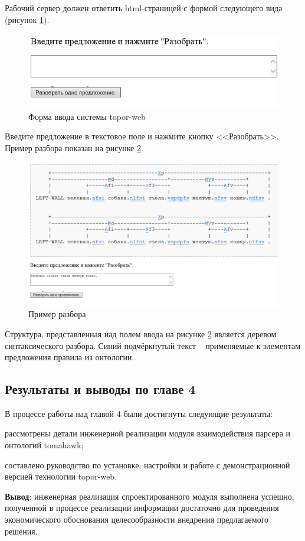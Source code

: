 Рабочий сервер должен ответить html-страницей с формой следующего
вида (рисунок \ref{fig:form}).

\begin{figure}[H]
	\centering
		\includegraphics[scale=1.0]{images/form.png}
	\caption{\small Форма ввода системы topor-web}
	\label{fig:form}
\end{figure} 

Введите предложение в текстовое поле и нажмите кнопку <<Разобрать>>.
Пример разбора показан на рисунке \ref{fig:parse}.

\begin{figure}[H]
	\centering
		\includegraphics[scale=0.5]{images/parse.png}
	\caption{\small Пример разбора}
	\label{fig:parse}
\end{figure} 

Структура, представленная над полем ввода на рисунке \ref{fig:parse} является
деревом синтаксического разбора. Синий подчёркнутый текст – применяемые
к элементам предложения правила из онтологии.

\subsection{Результаты и выводы по главе 4}

В процессе работы над главой 4 были достигнуты следующие результаты:
\begin{list}{}{\leftmargin=1.5cm}
	\item рассмотрены детали инженерной реализации модуля взаимодействия парсера и онтологий tomahawk;
	\item составлено руководство по установке, настройки и работе с демонстрационной версией технологии topor-web.
\end{list}

\textbf{Вывод}: инженерная реализация спроектированного модуля выполнена успешно, полученной в процессе реализации информации достаточно для проведения экономического обоснования целесообразности внедрения предлагаемого решения.